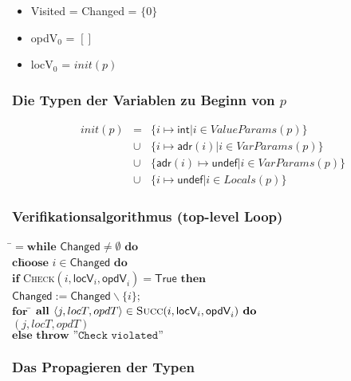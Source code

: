 \documentclass[german,10pt, a4paper, twocolumn]{scrartcl}
\theoremstyle{definition}
\theoremstyle{remark}
\begin{document}
\begin{itemize}
	\item \textsf{Visited} = \textsf{Changed} = $\{0\}$
	\item \textsf{opdV}$_0$ = $[]$
	\item \textsf{locV}$_0$ = $init(p)$
\end{itemize}

\subsubsection{Die Typen der Variablen zu Beginn von $p$}

\begin{eqnarray}
	init(p)&	= &	\{i\mapsto \textsf{int} | i\in ValueParams(p) \} \nonumber \\
	&		\cup &	\{i\mapsto \textsf{adr}(i) | i\in VarParams(p) \} \nonumber \\
	&		\cup &	\{\textsf{adr}(i) \mapsto \textsf{undef} | i \in VarParams(p) \} \nonumber \\
	&		\cup &	\{i \mapsto \textsf{undef} | i \in Locals(p) \} \nonumber
\end{eqnarray}

\subsubsection{Verifikationsalgorithmus (top-level Loop)}

\small
\begin{tabbing}
\=$ = \textbf{while } \textsf{Changed} \neq \emptyset \textbf{ do}$ \\
\>	$\textbf{ch}$\=$\textbf{oose } i \in \textsf{Changed} \textbf{ do}$\\
\>	\>	$\textbf{if }$\=\textsc{Check}$(i,\textsf{locV}_i,\textsf{opdV}_i)=\textsf{True }\textbf{then}$\\
\>	\>	\>	$\textsf{Changed} := \textsf{Changed}\backslash \{ i \}$;\\
\>	\>	\>	$\textbf{for}$ \= $\textbf{all } \langle j, locT, opdT \rangle \in \textsc{Succ}(i,\textsf{locV}_i,\textsf{opdV}_i) \textbf{ do}$\\
\>	\>	\>	\>	$(j,locT,opdT)$\\
\>	\>	$\textbf{else throw} \texttt{ ''Check violated''}$
\end{tabbing}
\normalsize

\subsubsection{Das Propagieren der Typen}
\end{document}
